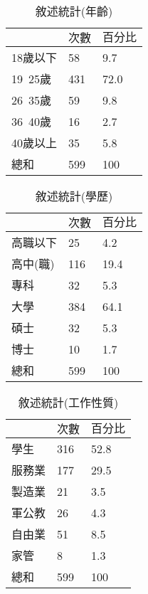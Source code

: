 \begin{table}[htb]
\caption{敘述統計(年齡)}
\label{tab:PL2}
\renewcommand{\arraystretch}{1.2} %
\arrayrulewidth=1pt               %
\tabcolsep=60pt                   %
%
\begin{tabular}[t]{lll}  %
\hline
 & $次數$ & $百分比$ \\
\hline
18歲以下        & 58  & 9.7 \\
19~25歲        & 431  & 72.0 \\
26~35歲        & 59  & 9.8 \\
36~40歲        & 16  &2.7\\
40歲以上        & 35  & 5.8 \\
總和               & 599  & 100 \\
\hline
\end{tabular}
\end{table}

\begin{table}[htb]
\caption{敘述統計(學歷)}
\label{tab:PL3}
\renewcommand{\arraystretch}{1.2} %
\arrayrulewidth=1pt               %
\tabcolsep=60pt                   %
%
\begin{tabular}[t]{lll}  %
\hline
 & $次數$ & $百分比$ \\
\hline
高職以下       & 25  & 4.2 \\
高中(職)        & 116  &19.4\\
專科        & 32  & 5.3 \\
大學        & 384 &64.1\\
碩士        & 32  & 5.3 \\
博士           & 10  & 1.7 \\
總和           & 599  & 100 \\
\hline
\end{tabular}
\end{table}

\begin{table}[htb]
\caption{敘述統計(工作性質)}
\label{tab:PL4}
\renewcommand{\arraystretch}{1.2} %
\arrayrulewidth=1pt               %
\tabcolsep=60pt                   %
\begin{tabular}[t]{lll}  %
\hline
 & $次數$ & $百分比$ \\
\hline
學生           & 316  & 52.8 \\
服務業        & 177  & 29.5 \\
製造業        & 21  & 3.5 \\
軍公教        & 26  &4.3\\
自由業        & 51  & 8.5 \\
家管           & 8  & 1.3 \\
總和               & 599  & 100 \\
\hline
\end{tabular}
\end{table}

